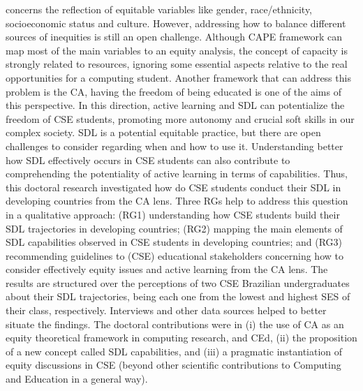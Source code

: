 


    



\begin{resumo}[Abstract]

 concerns the reflection of equitable variables like gender, race/ethnicity, socioeconomic status  and culture. However, addressing how to balance different sources of inequities is still an open challenge. Although \gls{CAPE} framework can map most of the main variables to an equity analysis, the concept of capacity is strongly related to resources, ignoring some essential aspects relative to the real opportunities for a computing student. Another framework that can address this problem is the \gls{CA}, having the freedom of being educated is one of the aims of this perspective. In this direction, active learning and \gls{SDL} can potentialize the freedom of \gls{CSE} students, promoting more autonomy and crucial soft skills in our complex society. \gls{SDL} is a potential equitable practice, but there are open challenges to consider regarding when and how to use it. Understanding better how \gls{SDL} effectively occurs in \gls{CSE} students can also contribute to comprehending the potentiality of active learning in terms of capabilities. Thus, this doctoral research investigated how do \gls{CSE} students conduct their \gls{SDL} in developing countries from the \gls{CA} lens. Three \glspl{RG} help to address this question in a qualitative approach: (\gls{RG}1) understanding how \gls{CSE} students build their \gls{SDL} trajectories in developing countries; (\gls{RG}2) mapping the main elements of \gls{SDL} capabilities observed in \gls{CSE} students in developing countries; and (\gls{RG}3) recommending guidelines to (\gls{CSE}) educational stakeholders concerning how to consider effectively equity issues and active learning from the \gls{CA} lens.  The results are structured over the perceptions of two \gls{CSE} Brazilian undergraduates about their \gls{SDL} trajectories, being each one from the lowest and highest \gls{SES} of their class, respectively. Interviews and other data sources helped to better situate the findings. The doctoral contributions were in (i) the use of \gls{CA} as an equity theoretical framework in computing research, and \gls{CEd}, (ii) the proposition of a new concept called \gls{SDL} capabilities, and (iii) a pragmatic instantiation of equity discussions in \gls{CSE} (beyond other scientific contributions to Computing and Education in a general way).


\end{resumo}
